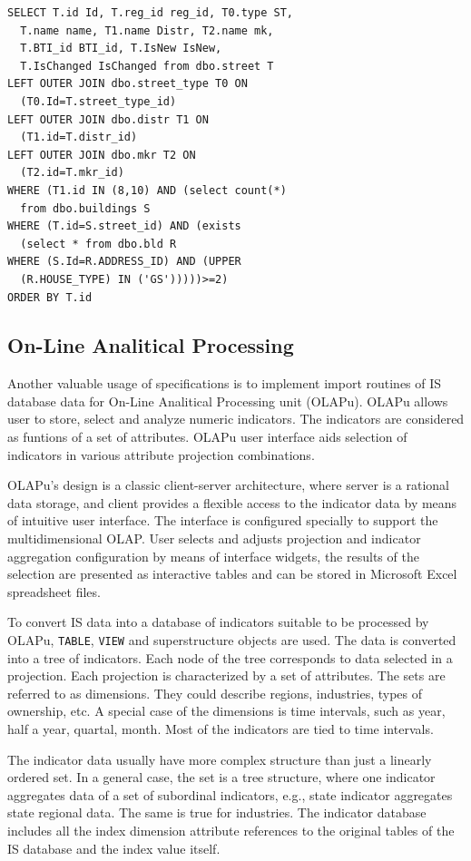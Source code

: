 \documentclass[conference]{IEEEtran}
\begin{document}
\begin{lstlisting}
SELECT T.id Id, T.reg_id reg_id, T0.type ST,
  T.name name, T1.name Distr, T2.name mk,
  T.BTI_id BTI_id, T.IsNew IsNew,
  T.IsChanged IsChanged from dbo.street T
LEFT OUTER JOIN dbo.street_type T0 ON
  (T0.Id=T.street_type_id)
LEFT OUTER JOIN dbo.distr T1 ON
  (T1.id=T.distr_id)
LEFT OUTER JOIN dbo.mkr T2 ON
  (T2.id=T.mkr_id)
WHERE (T1.id IN (8,10) AND (select count(*)
  from dbo.buildings S
WHERE (T.id=S.street_id) AND (exists
  (select * from dbo.bld R
WHERE (S.Id=R.ADDRESS_ID) AND (UPPER
  (R.HOUSE_TYPE) IN ('GS')))))>=2)
ORDER BY T.id
\end{lstlisting}

\subsection{On-Line Analitical Processing}
\label{sec:olap}

Another valuable usage of specifications is to implement import routines of IS database data for On-Line Analitical Processing unit (OLAPu).  OLAPu allows user to store, select and analyze numeric indicators.  The indicators are considered as funtions of a set of attributes.  OLAPu  user interface aids selection of indicators in various attribute projection combinations.

OLAPu's design is a classic client-server architecture, where server is a rational data storage, and client provides a flexible access to the indicator data by means of intuitive user interface.  The interface is configured specially to support the multidimensional OLAP.  User  selects and adjusts projection and indicator aggregation configuration by means of interface widgets, the results of the selection are presented as interactive tables and can be stored in Microsoft Excel spreadsheet files.

To convert IS data into a database of indicators suitable to be processed by OLAPu, \texttt{TABLE}, \texttt{VIEW} and superstructure objects are used.  The data is converted into a tree of indicators.  Each node of the tree corresponds to data selected in a projection.  Each projection is characterized by a set of attributes.  The sets are referred to as dimensions.  They could describe regions, industries, types of ownership, etc.  A special case of the dimensions is time intervals, such as year, half a year, quartal, month.  Most of the indicators are tied to time intervals.

The indicator data usually have more complex structure than just a linearly ordered set.  In a general case, the set is a tree structure, where one indicator aggregates data of a set of subordinal indicators, e.g., state indicator aggregates state regional data.  The same is true for industries.  The indicator database includes all the index dimension attribute references to the original tables of the IS database and the index value itself.
\end{document}
